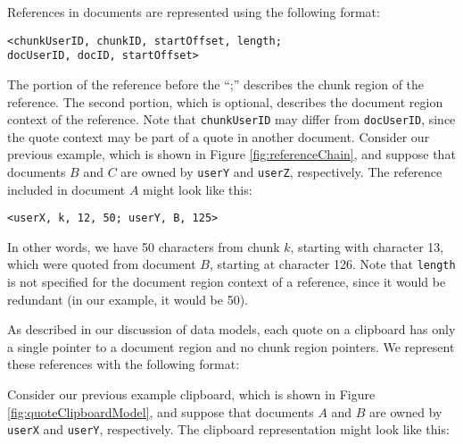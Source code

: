 \documentclass{acm_proc_article-sp}
\begin{document}
References in documents are represented using the following format:
\begin{center}
{\tt <chunkUserID, chunkID, startOffset, length;\\ 
docUserID, docID, startOffset>} 
\end{center}
The portion of the reference before the ``;'' describes the chunk region of the reference.  
The second portion, which is optional, describes the document region context of the reference.  
Note that {\tt chunkUserID} may differ from {\tt docUserID}, since the quote context may be part of a quote in another document.
Consider our previous example, which is shown in Figure \ref{fig:referenceChain}, and suppose that documents $B$ and  $C$ are owned by {\tt userY} and {\tt userZ}, respectively.
The reference included in document $A$ might look like this:
\begin{center}
{\tt <userX, k, 12, 50; userY, B, 125>} 
\end{center}
In other words, we have 50 characters from chunk $k$, starting with character 13, which were quoted from document $B$, starting at character 126.
Note that {\tt length} is not specified for the document region context of a reference, since it would be redundant (in our example, it would be 50).


As described in our discussion of data models, each quote on a clipboard has only a single pointer to a document region and no chunk region pointers.
We represent these references with the following format:
\begin{center}
{\tt <docUserID, docID, startOffset, length>} 
\end{center}
Consider our previous example clipboard, which is shown in Figure \ref{fig:quoteClipboardModel}, and suppose that documents $A$ and  $B$ are owned by {\tt userX} and {\tt userY}, respectively.
The clipboard representation might look like this:
\begin{center}
{\tt <userX, A, 37, 75>}\\
{\tt <userY, B, 100, 50>}\\ 
\end{center}
\end{document}
